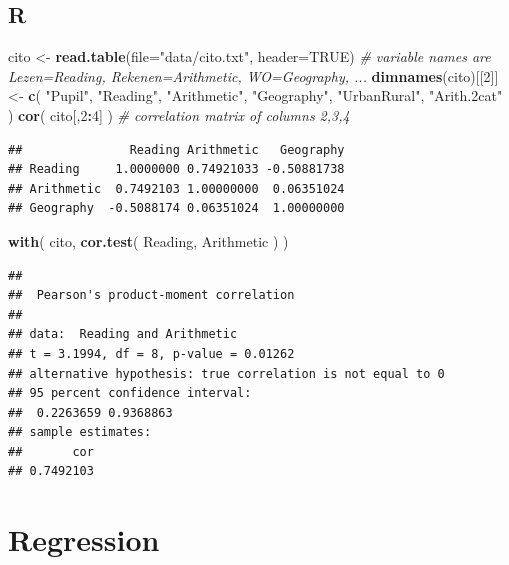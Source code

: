 \documentclass[
]{book}
\newenvironment{Shaded}{\begin{snugshade}}{\end{snugshade}}
\newcommand{\CommentTok}[1]{\textcolor[rgb]{0.56,0.35,0.01}{\textit{#1}}}
\newcommand{\DataTypeTok}[1]{\textcolor[rgb]{0.13,0.29,0.53}{#1}}
\newcommand{\DecValTok}[1]{\textcolor[rgb]{0.00,0.00,0.81}{#1}}
\newcommand{\KeywordTok}[1]{\textcolor[rgb]{0.13,0.29,0.53}{\textbf{#1}}}
\newcommand{\NormalTok}[1]{#1}
\newcommand{\OperatorTok}[1]{\textcolor[rgb]{0.81,0.36,0.00}{\textbf{#1}}}
\newcommand{\OtherTok}[1]{\textcolor[rgb]{0.56,0.35,0.01}{#1}}
\newcommand{\StringTok}[1]{\textcolor[rgb]{0.31,0.60,0.02}{#1}}
\begin{document}
\hypertarget{r-6}{%
\subsection{R}\label{r-6}}

\begin{Shaded}
\begin{Highlighting}[]
\NormalTok{cito \textless{}{-}}\StringTok{ }\KeywordTok{read.table}\NormalTok{(}\DataTypeTok{file=}\StringTok{"data/cito.txt"}\NormalTok{, }\DataTypeTok{header=}\OtherTok{TRUE}\NormalTok{)}
\CommentTok{\# variable names are Lezen=Reading, Rekenen=Arithmetic, WO=Geography, ...}
\KeywordTok{dimnames}\NormalTok{(cito)[[}\DecValTok{2}\NormalTok{]] \textless{}{-}}\StringTok{ }\KeywordTok{c}\NormalTok{( }\StringTok{"Pupil"}\NormalTok{, }\StringTok{"Reading"}\NormalTok{, }\StringTok{"Arithmetic"}\NormalTok{, }\StringTok{"Geography"}\NormalTok{,}
                          \StringTok{"UrbanRural"}\NormalTok{, }\StringTok{"Arith.2cat"}\NormalTok{ )}
\KeywordTok{cor}\NormalTok{( cito[,}\DecValTok{2}\OperatorTok{:}\DecValTok{4}\NormalTok{] ) }\CommentTok{\# correlation matrix of columns 2,3,4}
\end{Highlighting}
\end{Shaded}

\begin{verbatim}
##               Reading Arithmetic   Geography
## Reading     1.0000000 0.74921033 -0.50881738
## Arithmetic  0.7492103 1.00000000  0.06351024
## Geography  -0.5088174 0.06351024  1.00000000
\end{verbatim}

\begin{Shaded}
\begin{Highlighting}[]
\KeywordTok{with}\NormalTok{( cito, }\KeywordTok{cor.test}\NormalTok{( Reading, Arithmetic ) )}
\end{Highlighting}
\end{Shaded}

\begin{verbatim}
## 
##  Pearson's product-moment correlation
## 
## data:  Reading and Arithmetic
## t = 3.1994, df = 8, p-value = 0.01262
## alternative hypothesis: true correlation is not equal to 0
## 95 percent confidence interval:
##  0.2263659 0.9368863
## sample estimates:
##       cor 
## 0.7492103
\end{verbatim}

\hypertarget{sec:regression}{%
\section{Regression}\label{sec:regression}}
\end{document}
